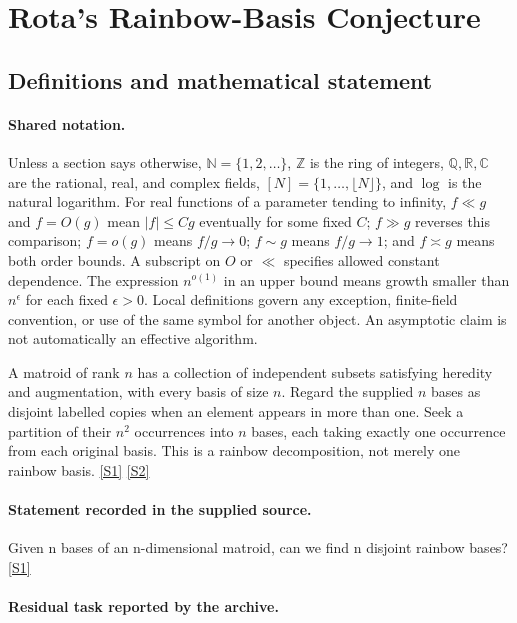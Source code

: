 \documentclass[11pt,a4paper]{article}
\newcommand{\N}{\mathbb{N}}
\newcommand{\Z}{\mathbb{Z}}
\newcommand{\Q}{\mathbb{Q}}
\newcommand{\R}{\mathbb{R}}
\newcommand{\C}{\mathbb{C}}
\newcommand{\sref}[2]{\hyperlink{source:#1:#2}{[S#2]}}
\begin{document}
\section{Rota’s Rainbow-Basis Conjecture}\label{statement}


\subsection{Definitions and mathematical statement}

\paragraph{Shared notation.}Unless a section says otherwise, $\N=\{1,2,\ldots\}$,
$\Z$ is the ring of integers, $\Q,\R,\C$ are the rational, real, and complex
fields, $[N]=\{1,\ldots,\lfloor N\rfloor\}$, and $\log$ is the natural
logarithm. For real functions of a parameter tending to infinity,
$f\ll g$ and $f=O(g)$ mean $|f|\leq Cg$ eventually for some fixed $C$;
$f\gg g$ reverses this comparison; $f=o(g)$ means $f/g\to0$;
$f\sim g$ means $f/g\to1$; and $f\asymp g$ means both order bounds.
A subscript on $O$ or $\ll$ specifies allowed constant dependence.
The expression $n^{o(1)}$ in an upper bound means growth smaller than
$n^\epsilon$ for each fixed $\epsilon>0$. Local definitions govern any
exception, finite-field convention, or use of the same symbol for another
object. An asymptotic claim is not automatically an effective algorithm.



A matroid of rank $n$ has a collection of independent subsets satisfying heredity and augmentation, with every basis of size $n$. Regard the supplied $n$ bases as disjoint labelled copies when an element appears in more than one. Seek a partition of their $n^2$ occurrences into $n$ bases, each taking exactly one occurrence from each original basis. This is a rainbow decomposition, not merely one rainbow basis. \sref{statement}{1} \sref{statement}{2}

\paragraph{Statement recorded in the supplied source.}
Given n bases of an n-dimensional matroid, can we find n disjoint rainbow bases? \sref{statement}{1}

\paragraph{Residual task reported by the archive.}
\end{document}

